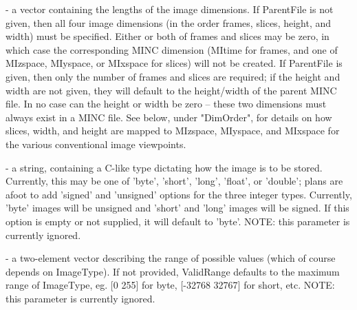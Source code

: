 \begin{description}
\item {}   - a vector containing the lengths of the image
                 dimensions.  If ParentFile is not given, then all
                 four image dimensions (in the order frames, slices,
                 height, and width) must be specified.  Either or both
                 of frames and slices may be zero, in which case the
                 corresponding MINC dimension (MItime for frames, and
                 one of MIzspace, MIyspace, or MIxspace for slices)
                 will not be created.  If ParentFile is given, then
                 only the number of frames and slices are required; if
                 the height and width are not given, they will default
                 to the height/width of the parent MINC file.  In no
                 case can the height or width be zero -- these two
                 dimensions must always exist in a MINC file.  See
                 below, under "DimOrder", for details on how slices,
                 width, and height are mapped to MIzspace, MIyspace,
                 and MIxspace for the various conventional image
                 viewpoints.
\end{description}
 
\begin{description}
\item {}  - a string, containing a C-like type dictating how the
                 image is to be stored.  Currently, this may be one of
                 'byte', 'short', 'long', 'float', or 'double'; plans
                 are afoot to add 'signed' and 'unsigned' options for
                 the three integer types.  Currently, 'byte' images will
                 be unsigned and 'short' and 'long' images will be
                 signed.  If this option is empty or not supplied, it
                 will default to 'byte'.  NOTE: this parameter is currently
                 ignored.
\end{description}
                 
\begin{description}
\item {} - a two-element vector describing the range of possible 
                 values (which of course depends on ImageType).  If
                 not provided, ValidRange defaults to the maximum
                 range of ImageType, eg. [0 255] for byte, [-32768
                 32767] for short, etc.  NOTE: this parameter is currently
                 ignored.
\end{description}
 
